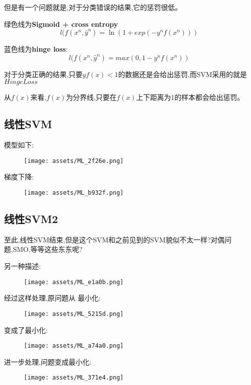 \documentclass[UTF8,a4paper]{ctexart}
\begin{document}
    但是有一个问题就是,对于分类错误的结果,它的惩罚很低。

    绿色线为\textbf{Sigmoid + cross entropy}
    \begin{equation}
        l(f(x^n , \hat y^n) = \ln(1 + exp(-y^n f(x^n)))
    \end{equation}

    蓝色线为\textbf{hinge loss}:
    \begin{equation}
        l(f(x^n , \hat y^n) = max(0, 1 - y^n f(x^n))
    \end{equation}

    对于分类正确的结果,只要$yf(x) < 1$的数据还是会给出惩罚,而SVM采用的就是$Hinge Loss$

    从$f(x)$来看,$f(x)$为分界线,只要在$f(x)$上下距离为1的样本都会给出惩罚。

        \subsection{线性SVM}
        模型如下:
        \begin{figure}[H]
            \centering
            \texttt{[image: assets/ML\_2f26e.png]}
            \label{figlinearSVM}
        \end{figure}

        梯度下降:
        \begin{figure}[H]
            \centering
            \texttt{[image: assets/ML\_b932f.png]}
            \label{figlinearSVMGradientDescent}
        \end{figure}

        \subsection{线性SVM2}
        {\color{red} 至此,线性SVM结束,但是这个SVM和之前见到的SVM貌似不太一样?对偶问题,SMO,等等这些东东呢?}

        另一种描述:
        \begin{figure}[H]
            \centering
            \texttt{[image: assets/ML\_e1a0b.png]}
        \end{figure}

        经过这样处理,原问题从
        最小化:
        \begin{figure}[H]
            \centering
            \texttt{[image: assets/ML\_5215d.png]}
        \end{figure}

        变成了最小化:
        \begin{figure}[H]
            \centering
            \texttt{[image: assets/ML\_a74a0.png]}
        \end{figure}

        进一步处理,问题变成最小化:
        \begin{figure}[H]
            \centering
            \texttt{[image: assets/ML\_371e4.png]}
        \end{figure}
\end{document}
